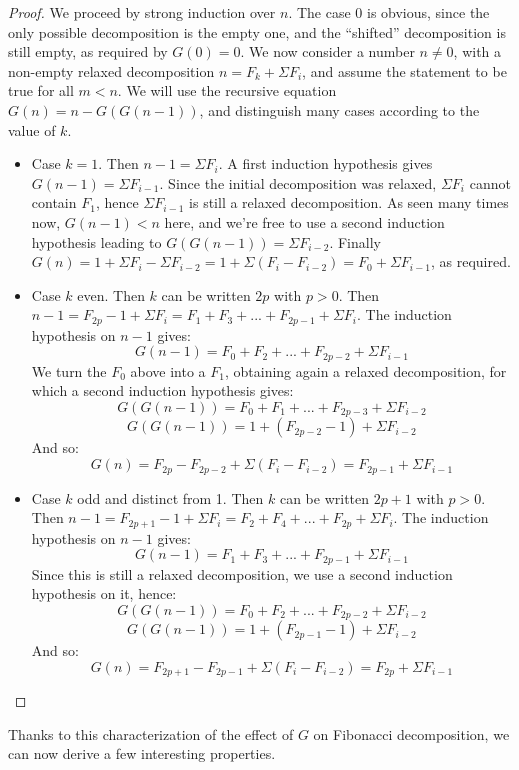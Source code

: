 \documentclass[a4paper,11pt]{article}
\begin{document}
\begin{proof}
We proceed by strong induction over $n$. The case $0$ is obvious,
since the only possible decomposition is the empty one, and the
``shifted'' decomposition is still empty, as required by $G(0)=0$.
We now consider a number $n\neq 0$, with a non-empty relaxed decomposition
$n = F_k+\Sigma F_i$, and assume the statement to be true for all $m<n$.
We will use the recursive equation $G(n)=n-G(G(n-1))$, and distinguish
many cases according to the value of $k$.
\begin{itemize}
\item Case $k=1$. Then $n-1 = \Sigma F_i$. A first induction
  hypothesis gives $G(n-1) = \Sigma F_{i-1}$. Since the initial
  decomposition was relaxed, $\Sigma F_i$ cannot contain $F_1$,
  hence $\Sigma F_{i-1}$ is still a relaxed decomposition. As seen
  many times now, $G(n-1)<n$ here, and we're free to use a second
  induction hypothesis leading to $G(G(n-1)) = \Sigma F_{i-2}$.
  Finally $G(n) = 1+\Sigma F_i - \Sigma F_{i-2} = 1 + \Sigma (F_i-F_{i-2})
   = F_0 + \Sigma F_{i-1}$, as required.
\item Case $k$ even. Then $k$ can be written $2p$ with $p>0$.
  Then $n-1 = F_{2p}-1 + \Sigma F_i = F_1+F_3+...+F_{2p-1}+\Sigma F_i$.
  The induction hypothesis on $n-1$ gives:
  $$G(n-1) = F_0+F_2+...+F_{2p-2}+\Sigma F_{i-1}$$
  We turn the $F_0$ above into a $F_1$, obtaining again a relaxed
  decomposition, for which a second induction hypothesis gives:
  $$G(G(n-1)) = F_0+F_1+...+F_{2p-3}+\Sigma F_{i-2}$$
  $$G(G(n-1)) = 1 + (F_{2p-2}-1)+\Sigma F_{i-2}$$
  And so:
  $$G(n) = F_{2p}-F_{2p-2} + \Sigma (F_i - F_{i-2}) =
           F_{2p-1} + \Sigma F_{i-1}$$

\item Case $k$ odd and distinct from 1. Then $k$ can be written $2p+1$ with $p>0$.
  Then $n-1 = F_{2p+1}-1 + \Sigma F_i = F_2+F_4+...+F_{2p}+\Sigma F_i$.
  The induction hypothesis on $n-1$ gives:
  $$G(n-1) = F_1+F_3+...+F_{2p-1}+\Sigma F_{i-1}$$
  Since this is still a relaxed decomposition, we use a second
  induction hypothesis on it, hence:
  $$G(G(n-1)) = F_0+F_2+...+F_{2p-2}+\Sigma F_{i-2}$$
  $$G(G(n-1)) = 1 + (F_{2p-1}-1)+\Sigma F_{i-2}$$
  And so:
  $$G(n) = F_{2p+1}-F_{2p-1} + \Sigma (F_i - F_{i-2}) =
           F_{2p} + \Sigma F_{i-1}$$
\end{itemize}
\end{proof}

Thanks to this characterization of the effect of $G$ on Fibonacci
decomposition, we can now derive a few interesting properties.
\end{document}
